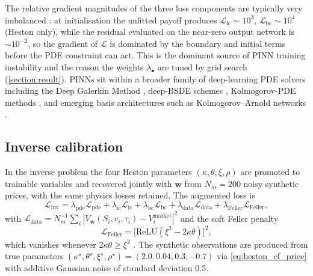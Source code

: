 The relative gradient magnitudes of the three loss components are typically very imbalanced \parencite{wang2021understanding,wang2022expert,krishnapriyan2021characterizing}: at initialisation the unfitted payoff produces $\mathcal{L}_{\mathrm{ic}}\sim 10^{3}$, $\mathcal{L}_{\mathrm{bc}}\sim 10^{4}$ (Heston only), while the residual evaluated on the near-zero output network is $\sim 10^{-2}$, so the gradient of $\mathcal{L}$ is dominated by the boundary and initial terms before the PDE constraint can act. This is the dominant source of PINN training instability and the reason the weights $\lambda_{\bullet}$ are tuned by grid search (\cref{section:result}). PINNs sit within a broader family of deep-learning PDE solvers including the Deep Galerkin Method \parencite{sirignano2018dgm}, deep-BSDE schemes \parencite{han2018solving,e2017deep,beck2020deepbsde}, Kolmogorov-PDE methods \parencite{beck2021deep}, and emerging basis architectures such as Kolmogorov--Arnold networks \parencite{liu2024kan}.

\subsection{Inverse calibration}\label{subsec:inverse}

In the inverse problem the four Heston parameters $(\kappa,\theta,\xi,\rho)$ are promoted to trainable variables and recovered jointly with $\boldsymbol{w}$ from $N_m=200$ noisy synthetic prices, with the same physics losses retained. The augmented loss is
\begin{equation}\label{eq:inverse_loss}
    \mathcal{L}_{\mathrm{inv}}=\lambda_{\mathrm{pde}}\mathcal{L}_{\mathrm{pde}}+\lambda_{\mathrm{ic}}\mathcal{L}_{\mathrm{ic}}+\lambda_{\mathrm{bc}}\mathcal{L}_{\mathrm{bc}}+\lambda_{\mathrm{data}}\mathcal{L}_{\mathrm{data}}+\lambda_{\mathrm{Feller}}\mathcal{L}_{\mathrm{Feller}},
\end{equation}
with $\mathcal{L}_{\mathrm{data}}=N_m^{-1}\sum_i|V_{\boldsymbol{w}}(S_i,v_i,\tau_i)-V_i^{\mathrm{market}}|^2$ and the soft Feller penalty
\begin{equation}\label{eq:feller_loss}
    \mathcal{L}_{\mathrm{Feller}}=\big[\mathrm{ReLU}(\xi^2-2\kappa\theta)\big]^2,
\end{equation}
which vanishes whenever $2\kappa\theta\ge\xi^2$ \parencite{feller1951two,cox1985cir}. The synthetic observations are produced from true parameters $(\kappa^\star,\theta^\star,\xi^\star,\rho^\star)=(2.0,0.04,0.3,-0.7)$ via \eqref{eq:heston_cf_price} with additive Gaussian noise of standard deviation $0.5$.


